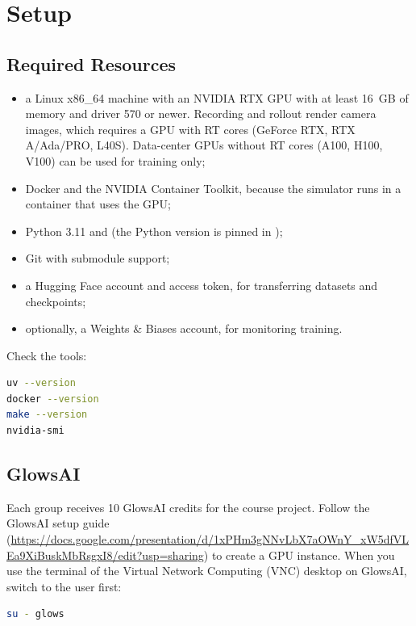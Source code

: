 \documentclass[11pt]{article}
\DeclareRobustCommand{\code}{\codeurl}  %
\begin{document}
\section{Setup}
\label{sec:setup}

\subsection{Required Resources}

\begin{itemize}
  \item a Linux x86\_64 machine with an NVIDIA RTX GPU with at least 16~GB of memory and driver 570 or newer. Recording and rollout render camera images, which requires a GPU with RT cores (GeForce RTX, RTX A/Ada/PRO, L40S). Data-center GPUs without RT cores (A100, H100, V100) can be used for training only;
  \item Docker and the NVIDIA Container Toolkit, because the simulator runs in a container that uses the GPU;
  \item Python 3.11 and \code{uv} (the Python version is pinned in \code{.python-version});
  \item Git with submodule support;
  \item a Hugging Face account and access token, for transferring datasets and checkpoints;
  \item optionally, a Weights \& Biases account, for monitoring training.
\end{itemize}

Check the tools:
\begin{lstlisting}[language=bash]
uv --version
docker --version
make --version
nvidia-smi
\end{lstlisting}


\subsection{GlowsAI}

Each group receives 10 GlowsAI credits for the course project. Follow the GlowsAI setup guide
(\url{https://docs.google.com/presentation/d/1xPHm3gNNvLbX7aOWnY_xW5dfVLEa9XiBuskMbRsgxI8/edit?usp=sharing})
to create a GPU instance. When you use the terminal of the Virtual Network Computing (VNC) desktop on GlowsAI, switch to the \code{glows} user first:

\begin{lstlisting}[language=bash]
su - glows
\end{lstlisting}
\end{document}
